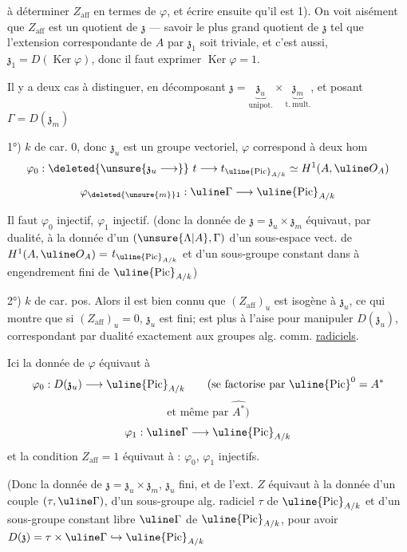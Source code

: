 à déterminer $Z_{\mathrm{aff}}$ en termes de $\varphi$, et écrire ensuite qu'il est 1).
On voit  aisément que $Z_{\mathrm{aff}}$ est un quotient  de \deleted{\unsure{$\varphi$}} $\mathfrak z$
--- savoir le plus grand quotient de $\mathfrak z$ tel que l'extension
correspondante de $A$ par $\mathfrak z_1$  soit triviale, et c'est aussi,
$\mathfrak z_1=D(\operatorname{Ker}\varphi)$, donc il faut exprimer $\operatorname{Ker}\varphi=1$.

 Il y a deux cas à distinguer, en décomposant
$\mathfrak z=\underbrace{\mathfrak z_u}_{\mathrm{unipot.}}\times\underbrace{\mathfrak z_m}_{\mathrm{t.\ mult.}}$,
et posant $\Gamma=D(\mathfrak z_m)$

1°) $k$ de car. 0, donc $\mathfrak z_u$ est un groupe vectoriel,  $\varphi$
correspond à deux hom
\[
\varphi_0:\deleted{\unsure{\mathfrak z_u\longrightarrow}}\ t\longrightarrow
 t_{\uline{\operatorname{Pic}}_{A/k}}\simeq H^1(A,\uline O_A)
\]
\[
\varphi_{\deleted{\unsure{m}}1}:\uline\Gamma\longrightarrow\uline{\operatorname{Pic}}_{A/k}
\]

Il faut $\varphi_0$ injectif, $\varphi_1$ injectif. (donc la donnée de
$\mathfrak z=\mathfrak z_u\times\mathfrak z_m$  équivaut, par dualité, à la donnée d'un 
 $(\unsure{\Lambda|A},\Gamma)$ d'un  sous-espace vect. de $H^1(A,\uline O_A)=$
$t_{\uline{\operatorname{Pic}}_{A/k}}$ et d'un sous-groupe constant dans 
 à engendrement fini de $\uline{\operatorname{Pic}}_{A/k}$)

2°) $k$ de car. pos. Alors  il est bien connu que
$(Z_{\mathrm{aff}})_u$  est isogène à $\mathfrak z_u$, ce qui montre que si
$(Z_{\mathrm{aff}})_u=0$, $\mathfrak z_u$ est fini;  est plus à l'aise pour
manipuler $D(\mathfrak z_u)$, 
correspondant par dualité exactement aux groupes alg. comm. \uline{radiciels}.

Ici la donnée de $\varphi$ équivaut à
\[
\varphi_0:D(\mathfrak z_u)\longrightarrow\uline{\operatorname{Pic}}_{A/k}
\qquad\text{(se factorise par $\uline{\operatorname{Pic}}^0=A^*$}
\]
\[\text{et même par $\widehat{A^*}$)}\]
\[
\varphi_1:\uline\Gamma\longrightarrow\uline{\operatorname{Pic}}_{A/k}
\]
et la condition $Z_{\mathrm{aff}}=1$ équivaut à : $\varphi_0$, $\varphi_1$ injectifs.

(Donc la donnée de $\mathfrak z=\mathfrak z_u\times\mathfrak z_m$, $\mathfrak z_u$ fini, et de l'ext. $Z$ équivaut
à la donnée d'un couple $(\tau,\uline\Gamma)$, d'un sous-groupe alg.
radiciel $\tau$ de $\uline{\operatorname{Pic}}_{A/k}$ et d'un sous-groupe constant libre
$\uline\Gamma$ de $\uline{\operatorname{Pic}}_{A/k}$, pour avoir $D(\mathfrak z)=\tau\times\uline\Gamma\hookrightarrow\uline{\operatorname{Pic}}_{A/k}$
